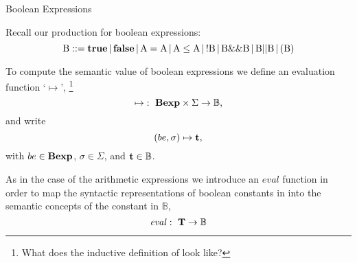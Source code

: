 \documentclass{beamer}
\begin{document}
\begin{frame}{Boolean Expressions}

\small
Recall our production for boolean expressions:
\[
\mbox{B} ::= \mbox{\bf true} \,|\, \mbox{\bf false} \,|\, \mbox{A} = \mbox{A} \,|\,
	\mbox{A} \le \mbox{A} \,|\, ! \mbox{B} \,|\, \mbox{B} \&\& \mbox{B} \,|\, 
	\mbox{B} || \mbox{B} \,|\, (\mbox{B})
\]

To compute the semantic value of boolean expressions we define an
evaluation function `$\mapsto$', \footnote{\tiny What does the inductive definition of  look like?}
\[
\mapsto \,\colon\; \mbox{\bf Bexp} \times \Sigma \rightarrow \mathbb{B},
\]
and write
\[
({be}, {\sigma} )\mapsto \mbox{\bf t},
\]
with $be \in\mbox{\bf Bexp}$, $\sigma\in\Sigma$, and $\mbox{\bf t}\in\mathbb{B}$.

\vspace{.1in}

As in the case of the arithmetic expressions we introduce an $\mathit{eval}$ function in order
to map the syntactic representations of  boolean constants in 
into the semantic concepts of the constant in $\mathbb{B}$,
\[
\mathit{eval}\,\colon\; \mbox{\bf T} \rightarrow \mathbb{B}
\]

\end{frame}
\end{document}
